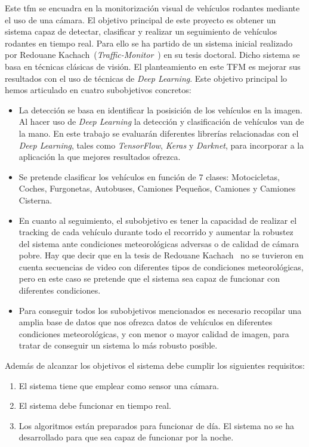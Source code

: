 Este \acrfull{tfm} se encuadra en la monitorización visual de vehículos rodantes mediante el uso de una cámara. El objetivo principal de este proyecto es obtener un sistema capaz de detectar, clasificar y realizar un seguimiento de vehículos rodantes en tiempo real. Para ello se ha partido de un sistema inicial realizado por Redouane Kachach~\cite{redo_tesis}(\textit{Traffic-Monitor}~\cite{traffic_monitor_redo}) en su tesis doctoral. Dicho sistema se basa en técnicas clásicas de visión. El planteamiento en este TFM es mejorar sus resultados con el uso de técnicas de \textit{Deep Learning}. Este objetivo principal lo hemos articulado en cuatro subobjetivos concretos:

\begin{itemize}
    \item La detección se basa en identificar la posisición de los vehículos en la imagen. Al hacer uso de \textit{Deep Learning} la detección y clasificación de vehículos van de la mano. En este trabajo se evaluarán diferentes  librerías relacionadas con el \textit{Deep Learning}, tales como \textit{TensorFlow}, \textit{Keras} y \textit{Darknet}, para incorporar a la aplicación la que mejores resultados ofrezca.
    \item Se pretende clasificar los vehículos en función de 7 clases: Motocicletas, Coches, Furgonetas, Autobuses, Camiones Pequeños, Camiones y Camiones Cisterna. 
    \item En cuanto al seguimiento, el subobjetivo es tener la capacidad de realizar el tracking de cada vehículo durante todo el recorrido y aumentar la robustez del sistema ante condiciones meteorológicas adversas o de calidad de cámara pobre. Hay que decir que en la tesis de Redouane Kachach~\cite{redo_tesis} no se tuvieron en cuenta secuencias de video con diferentes tipos de condiciones meteorológicas, pero en este caso se pretende que el sistema sea capaz de funcionar con diferentes condiciones.  
    \item Para conseguir todos los subobjetivos mencionados es necesario recopilar una amplia base de datos que nos ofrezca datos de vehículos en diferentes condiciones meteorológicas, y con menor o mayor calidad de imagen, para tratar de conseguir un sistema lo más robusto posible.
\end{itemize}


Además de alcanzar los objetivos el sistema debe cumplir los siguientes requisitos:
\begin{enumerate}
    \item El sistema tiene que emplear como sensor una cámara.
    \item El sistema debe funcionar en tiempo real.
    \item  Los algoritmos están preparados para funcionar de día. El sistema no se ha desarrollado para que sea capaz de funcionar por la noche.
\end{enumerate}
